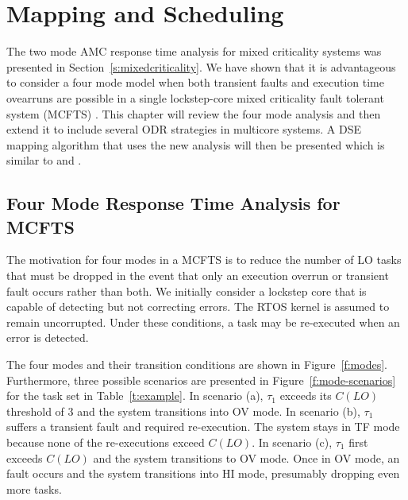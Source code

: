 
\chapter{Mapping and Scheduling} %

\label{c:sched} %


The two mode AMC response time analysis for mixed criticality systems was presented in Section~\ref{s:mixedcriticality}. We have shown that it is advantageous to consider a four mode model when both transient faults and execution time ovearruns are possible in a single lockstep-core mixed criticality fault tolerant system (MCFTS) \cite{albayati2016modes}. This chapter will review the four mode analysis and then extend it to include several ODR strategies in multicore systems. A DSE mapping algorithm that uses the new analysis will then be presented which is similar to \cite{bolchini2013reliability} and \cite{kang2014reliability}.

\section{Four Mode Response Time Analysis for MCFTS}

	The motivation for four modes in a MCFTS is to reduce the number of LO tasks that must be dropped in the event that only an execution overrun or transient fault occurs rather than both. 
	We initially consider a lockstep core that is capable of detecting but not correcting errors.
	The RTOS kernel is assumed to remain uncorrupted.
	Under these conditions, a task may be re-executed when an error is detected.
	
	The four modes and their transition conditions are shown in Figure~\ref{f:modes}. 
	Furthermore, three possible scenarios are presented in Figure~\ref{f:mode-scenarios} for the task set in Table~\ref{t:example}.
	In scenario (a), $\tau_1$ exceeds its $C(LO)$ threshold of 3 and the system transitions into OV mode. In scenario (b), $\tau_1$ suffers a transient fault and required re-execution. The system stays in TF mode because none of the re-executions exceed $C(LO)$. In scenario (c), $\tau_1$ first exceeds $C(LO)$ and the system transitions to OV mode. Once in OV mode, an fault occurs and the system transitions into HI mode, presumably dropping even more tasks.
	

